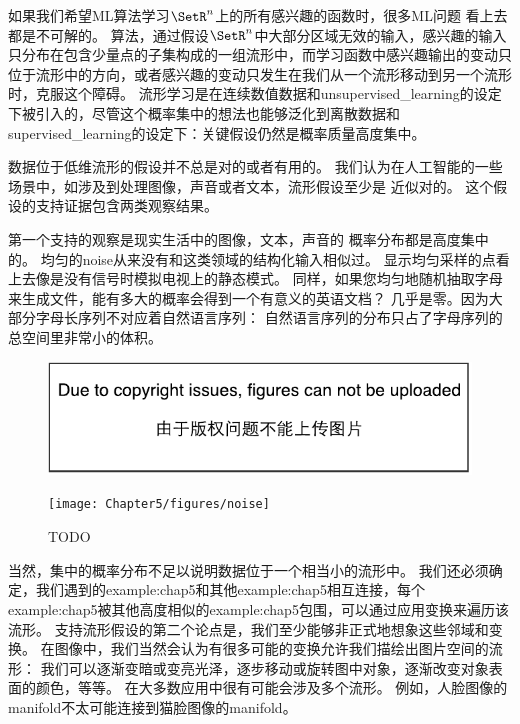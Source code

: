 如果我们希望\gls{ML}算法学习$\SetR^n$上的所有感兴趣的函数时，很多\gls{ML}问题
看上去都是不可解的。
算法，通过假设$\SetR^n$中大部分区域无效的输入，感兴趣的输入只分布在包含少量点的子集构成的一组流形中，而学习函数中感兴趣输出的变动只位于流形中的方向，或者感兴趣的变动只发生在我们从一个流形移动到另一个流形时，克服这个障碍。
流形学习是在连续数值数据和\gls{unsupervised_learning}的设定下被引入的，尽管这个概率集中的想法也能够泛化到离散数据和\gls{supervised_learning}的设定下：关键假设仍然是概率质量高度集中。


数据位于低维流形的假设并不总是对的或者有用的。
我们认为在人工智能的一些场景中，如涉及到处理图像，声音或者文本，流形假设至少是
近似对的。
这个假设的支持证据包含两类观察结果。

第一个支持的观察是现实生活中的图像，文本，声音的
概率分布都是高度集中的。
均匀的\gls{noise}从来没有和这类领域的结构化输入相似过。
显示均匀采样的点看上去像是没有信号时模拟电视上的静态模式。
同样，如果您均匀地随机抽取字母来生成文件，能有多大的概率会得到一个有意义的英语文档？
几乎是零。因为大部分字母长序列不对应着自然语言序列：
自然语言序列的分布只占了字母序列的总空间里非常小的体积。

\begin{figure}[!htb]
\ifOpenSource
\centerline{\includegraphics{figure.pdf}}
\else
\centerline{\texttt{[image: Chapter5/figures/noise]}}
\fi
\caption{TODO}
\label{fig:chap5_noise}
\end{figure}

当然，集中的概率分布不足以说明数据位于一个相当小的流形中。
我们还必须确定，我们遇到的\gls{example:chap5}和其他\gls{example:chap5}相互连接，每个\gls{example:chap5}被其他高度相似的\gls{example:chap5}包围，可以通过应用变换来遍历该流形。
支持流形假设的第二个论点是，我们至少能够非正式地想象这些邻域和变换。
在图像中，我们当然会认为有很多可能的变换允许我们描绘出图片空间的流形：
我们可以逐渐变暗或变亮光泽，逐步移动或旋转图中对象，逐渐改变对象表面的颜色，等等。
在大多数应用中很有可能会涉及多个流形。
例如，人脸图像的\gls{manifold}不太可能连接到猫脸图像的\gls{manifold}。


